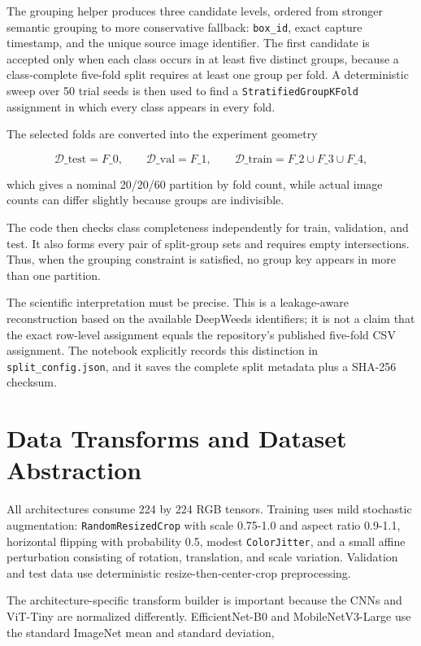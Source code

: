\documentclass[11pt,a4paper]{article}
\begin{document}
The grouping helper produces three candidate levels, ordered from stronger semantic grouping to more conservative fallback: \texttt{box\_id}, exact capture timestamp, and the unique source image identifier. The first candidate is accepted only when each class occurs in at least five distinct groups, because a class-complete five-fold split requires at least one group per fold. A deterministic sweep over 50 trial seeds is then used to find a \texttt{StratifiedGroupKFold} assignment in which every class appears in every fold.

The selected folds are converted into the experiment geometry

\begin{equation}
\mathcal{D}\_{\mathrm{test}} = F\_0, \qquad
\mathcal{D}\_{\mathrm{val}} = F\_1, \qquad
\mathcal{D}\_{\mathrm{train}} = F\_2 \cup F\_3 \cup F\_4,
\end{equation}

which gives a nominal 20/20/60 partition by fold count, while actual image counts can differ slightly because groups are indivisible.

The code then checks class completeness independently for train, validation, and test. It also forms every pair of split-group sets and requires empty intersections. Thus, when the grouping constraint is satisfied, no group key appears in more than one partition.

The scientific interpretation must be precise. This is a leakage-aware reconstruction based on the available DeepWeeds identifiers; it is not a claim that the exact row-level assignment equals the repository's published five-fold CSV assignment. The notebook explicitly records this distinction in \texttt{split\_config.json}, and it saves the complete split metadata plus a SHA-256 checksum.

\section{Data Transforms and Dataset Abstraction}
All architectures consume 224 by 224 RGB tensors. Training uses mild stochastic augmentation: \texttt{RandomResizedCrop} with scale 0.75-1.0 and aspect ratio 0.9-1.1, horizontal flipping with probability 0.5, modest \texttt{ColorJitter}, and a small affine perturbation consisting of rotation, translation, and scale variation. Validation and test data use deterministic resize-then-center-crop preprocessing.

The architecture-specific transform builder is important because the CNNs and ViT-Tiny are normalized differently. EfficientNet-B0 and MobileNetV3-Large use the standard ImageNet mean and standard deviation,
\end{document}
